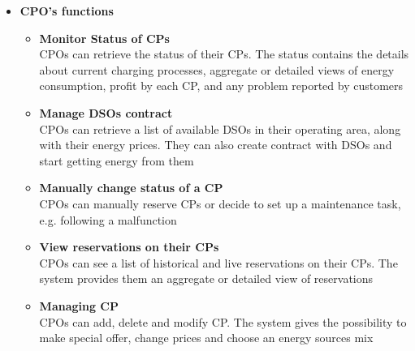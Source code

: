 \begin{itemize}
      \item \textbf{CPO's functions}
            \begin{itemize}
                  \item \textbf{Monitor Status of CPs}\\
                        CPOs can retrieve the status of their CPs. The status contains the details about current charging processes, aggregate or detailed views of energy consumption, profit by each CP, and any problem reported by customers
                  \item \textbf{Manage DSOs contract}\\
                        CPOs can retrieve a list of available DSOs in their operating area, along with their energy prices. They can also create contract with DSOs and start getting energy from them
                  \item \textbf{Manually change status of a CP}\\
                        CPOs can manually reserve CPs or decide to set up a maintenance task, e.g. following a malfunction
                  \item \textbf{View reservations on their CPs}\\
                        CPOs can see a list of historical and live reservations on their CPs. The system provides them an aggregate or detailed view of reservations
                  \item \textbf{Managing CP}\\
                        CPOs can add, delete and modify CP. The system gives the possibility to make special offer, change prices and choose an energy sources mix
            \end{itemize}
\end{itemize}


